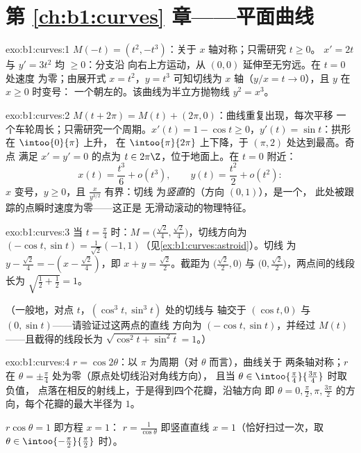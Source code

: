 \section*{第 \ref{ch:b1:curves} 章——平面曲线}

\begin{solution}{exo:b1:curves:1}
$M(-t) = (t^2, -t^3)$：关于 $x$ 轴对称；只需研究 $t \geq 0$。
$x' = 2t$ 与 $y' = 3t^2$ 均 $\geq 0$：分支沿
向右上方运动，从 $(0,0)$ 延伸至无穷远。在 $t = 0$ 处速度
为零；由展开式 $x = t^2$，$y = t^3$ 可知切线为
$x$ 轴（$y/x = t \to 0$），且 $y$ 在 $x \geq 0$ 时变号：
一个朝左的\emph{}。该曲线为半立方抛物线
$y^2 = x^3$。
\end{solution}

\begin{solution}{exo:b1:curves:2}
$M(t + 2\pi) = M(t) + (2\pi, 0)$：曲线重复出现，每次平移
一个车轮周长；只需研究一个周期。$x'(t) = 1 - \cos t \geq
0$，$y'(t) = \sin t$：拱形在 $\intoo{0}{\pi}$ 上升，
在 $\intoo{\pi}{2\pi}$ 上下降，于 $(\pi, 2)$ 处达到最高。奇点
满足 $x' = y' = 0$ 的点为 $t \in 2\pi\Z$，位于地面上。在 $t = 0$ 附近：
\[
x(t) = \frac{t^3}{6} + o(t^3),
\qquad
y(t) = \frac{t^2}{2} + o(t^2):
\]
$x$ 变号，$y \geq 0$，且 $\frac{x}{y^{3/2}}$ 有界：切线
为\emph{竖直}的（方向 $(0,1)$），是一个，
此处被跟踪的点瞬时速度为零——这正是
无滑动滚动的物理特征。
\end{solution}

\begin{solution}{exo:b1:curves:3}
当 $t = \frac\pi4$ 时：$M = \bigl(\frac{\sqrt2}{4},
\frac{\sqrt2}{4}\bigr)$，切线方向为 $(-\cos t, \sin t) =
\frac{1}{\sqrt2}(-1, 1)$（见\cref{ex:b1:curves:astroid}）。切线
为 $y - \frac{\sqrt2}{4} = -(x - \frac{\sqrt2}{4})$，即 $x +
y = \frac{\sqrt2}{2}$。截距为 $\bigl(\frac{\sqrt2}{2},
0\bigr)$ 与 $\bigl(0, \frac{\sqrt2}{2}\bigr)$，两点间的线段
长为 $\sqrt{\frac12 + \frac12} = 1$。

（一般地，对点 $t$，$(\cos^3 t, \sin^3 t)$ 处的切线与
轴交于 $(\cos t, 0)$ 与 $(0, \sin t)$——请验证过这两点的直线
方向为 $(-\cos t, \sin t)$，并经过
$M(t)$——且截得的线段长为 $\sqrt{\cos^2 t +
\sin^2 t} = 1$。）
\end{solution}

\begin{solution}{exo:b1:curves:4}
$r = \cos 2\theta$：以 $\pi$ 为周期（对 $\theta$ 而言），曲线关于
两条轴对称；$r$ 在 $\theta = \pm\frac\pi4$ 处为零（原点处切线沿对角线方向），
且当 $\theta \in
\intoo{\frac\pi4}{\frac{3\pi}{4}}$ 时取负值，
点落在相反的射线上，于是得到四个花瓣，沿轴方向
即 $\theta = 0, \frac\pi2, \pi, \frac{3\pi}{2}$ 的方向，每个花瓣的最大半径为
$1$。

$r\cos\theta = 1$ 即方程 $x = 1$： $r =
\frac{1}{\cos\theta}$ 即竖直直线 $x = 1$（恰好扫过一次，取
$\theta \in \intoo{-\frac\pi2}{\frac\pi2}$ 时）。
\end{solution}

